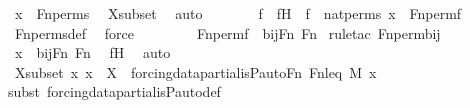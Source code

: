 \begin{isabellebody}
\ {\isachardoublequoteopen}x\ {\isasymin}\ Fn{\isacharunderscore}{\kern0pt}perms{\isachardoublequoteclose}\ \isamarkupfalse%
\ Xsubset\ \isamarkupfalse%
\ auto\isanewline
\ \ \ \ \isamarkupfalse%
\ \isamarkupfalse%
\ f\ \ fH\ {\isacharcolon}{\kern0pt}\ {\isachardoublequoteopen}f\ {\isasymin}\ nat{\isacharunderscore}{\kern0pt}perms{\isachardoublequoteclose}\ {\isachardoublequoteopen}x\ {\isacharequal}{\kern0pt}\ Fn{\isacharunderscore}{\kern0pt}perm{\isacharprime}{\kern0pt}{\isacharparenleft}{\kern0pt}f{\isacharparenright}{\kern0pt}{\isachardoublequoteclose}\ \isamarkupfalse%
\ Fn{\isacharunderscore}{\kern0pt}perms{\isacharunderscore}{\kern0pt}def\ \isamarkupfalse%
\ force\ \isanewline
\ \ \ \ \isamarkupfalse%
\ \isamarkupfalse%
\ {\isachardoublequoteopen}Fn{\isacharunderscore}{\kern0pt}perm{\isacharprime}{\kern0pt}{\isacharparenleft}{\kern0pt}f{\isacharparenright}{\kern0pt}\ {\isasymin}\ bij{\isacharparenleft}{\kern0pt}Fn{\isacharcomma}{\kern0pt}\ Fn{\isacharparenright}{\kern0pt}{\isachardoublequoteclose}\ \isamarkupfalse%
{\isacharparenleft}{\kern0pt}rule{\isacharunderscore}{\kern0pt}tac\ Fn{\isacharunderscore}{\kern0pt}perm{\isacharprime}{\kern0pt}{\isacharunderscore}{\kern0pt}bij{\isacharparenright}{\kern0pt}\isanewline
\ \ \ \ \isamarkupfalse%
\ \isamarkupfalse%
\ {\isachardoublequoteopen}x\ {\isasymin}\ bij{\isacharparenleft}{\kern0pt}Fn{\isacharcomma}{\kern0pt}\ Fn{\isacharparenright}{\kern0pt}{\isachardoublequoteclose}\ \isamarkupfalse%
\ fH\ \isamarkupfalse%
\ auto\isanewline
\ \ \isamarkupfalse%
\isanewline
\isanewline
\ \ \isamarkupfalse%
\ Xsubset{\isacharprime}{\kern0pt}{\isacharprime}{\kern0pt}{\isacharcolon}{\kern0pt}\ {\isachardoublequoteopen}{\isasymAnd}x{\isachardot}{\kern0pt}\ x\ {\isasymin}\ X\ {\isasymLongrightarrow}\ forcing{\isacharunderscore}{\kern0pt}data{\isacharunderscore}{\kern0pt}partial{\isachardot}{\kern0pt}is{\isacharunderscore}{\kern0pt}P{\isacharunderscore}{\kern0pt}auto{\isacharparenleft}{\kern0pt}Fn{\isacharcomma}{\kern0pt}\ Fn{\isacharunderscore}{\kern0pt}leq{\isacharcomma}{\kern0pt}\ M{\isacharcomma}{\kern0pt}\ x{\isacharparenright}{\kern0pt}{\isachardoublequoteclose}\ \isanewline
\ \ \ \ \isamarkupfalse%
{\isacharparenleft}{\kern0pt}subst\ forcing{\isacharunderscore}{\kern0pt}data{\isacharunderscore}{\kern0pt}partial{\isachardot}{\kern0pt}is{\isacharunderscore}{\kern0pt}P{\isacharunderscore}{\kern0pt}auto{\isacharunderscore}{\kern0pt}def{\isacharparenright}{\kern0pt}\isanewline

\end{isabellebody}
